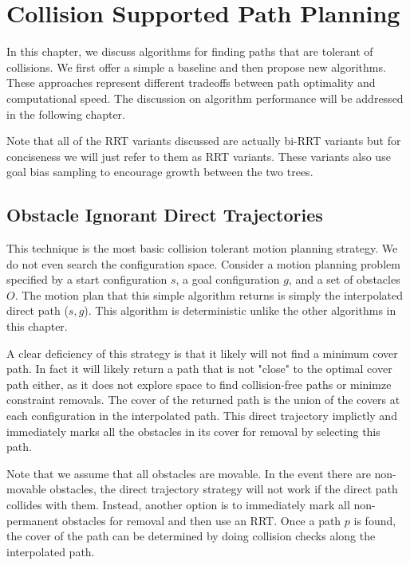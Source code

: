 \chapter{Collision Supported Path Planning} \label{chap:algos}
In this chapter, we discuss algorithms for finding paths that are tolerant of collisions. We first offer a simple a baseline and then propose new algorithms. These approaches represent different tradeoffs between path optimality and computational speed. The discussion on algorithm performance will be addressed in the following chapter.

Note that all of the RRT variants discussed are actually bi-RRT variants but for conciseness we will just refer to them as RRT variants. These variants also use goal bias sampling to encourage growth between the two trees.

\section{Obstacle Ignorant Direct Trajectories}
This technique is the most basic collision tolerant motion planning strategy. We do not even search the configuration space. Consider a motion planning problem specified by a start configuration $s$, a goal configuration $g$, and a set of obstacles $O$. The motion plan that this simple algorithm returns is simply the interpolated direct path ($s, g$). This algorithm is deterministic unlike the other algorithms in this chapter. 

A clear deficiency of this strategy is that it likely will not find a minimum cover path. In fact it will likely return a path that is not "close" to the optimal cover path either, as it does not explore space to find collision-free paths or minimze constraint removals. The cover of the returned path is the union of the covers at each configuration in the interpolated path. This direct trajectory implictly and immediately marks all the obstacles in its cover for removal by selecting this path.

Note that we assume that all obstacles are movable. In the event there are non-movable obstacles, the direct trajectory strategy will not work if the direct path collides with them. Instead, another option is to immediately mark all non-permanent obstacles for removal and then use an RRT. Once a path $p$ is found, the cover of the path can be determined by doing collision checks along the interpolated path.

